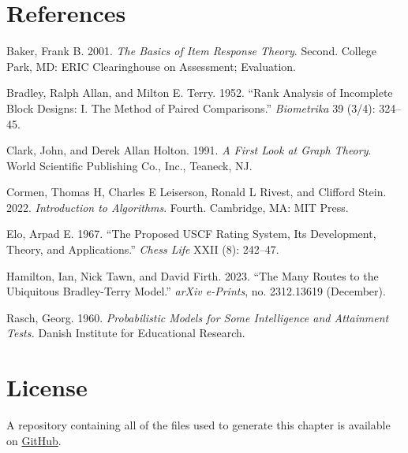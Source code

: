 \documentclass[
  letterpaper,
  DIV=11,
  numbers=noendperiod]{scrartcl}
\newlength{\cslhangindent}
\newenvironment{CSLReferences}[2] %
 {\begin{list}{}{%
  \setlength{\itemindent}{0pt}
  \setlength{\leftmargin}{0pt}
  \setlength{\parsep}{0pt}
  \ifodd #1
   \setlength{\leftmargin}{\cslhangindent}
   \setlength{\itemindent}{-1\cslhangindent}
  \fi
  \setlength{\itemsep}{#2\baselineskip}}}
 {\end{list}}
\begin{document}
\section*{References}\label{references}

\label{refs}
\begin{CSLReferences}{1}{0}
Baker, Frank B. 2001. \emph{The Basics of Item Response Theory}. Second.
College Park, MD: ERIC Clearinghouse on Assessment; Evaluation.

Bradley, Ralph Allan, and Milton E. Terry. 1952. {``Rank Analysis of
Incomplete Block Designs: I. The Method of Paired Comparisons.''}
\emph{Biometrika} 39 (3/4): 324--45.

Clark, John, and Derek Allan Holton. 1991. \emph{A First Look at Graph
Theory}. World Scientific Publishing Co., Inc., Teaneck, NJ.

Cormen, Thomas H, Charles E Leiserson, Ronald L Rivest, and Clifford
Stein. 2022. \emph{Introduction to Algorithms}. Fourth. Cambridge, MA:
MIT Press.

Elo, Arpad E. 1967. {``The Proposed USCF Rating System, Its Development,
Theory, and Applications.''} \emph{Chess Life} XXII (8): 242--47.

Hamilton, Ian, Nick Tawn, and David Firth. 2023. {``The Many Routes to
the Ubiquitous Bradley-Terry Model.''} \emph{arXiv e-Prints}, no.
2312.13619 (December).

Rasch, Georg. 1960. \emph{Probabilistic Models for Some Intelligence and
Attainment Tests.} Danish Institute for Educational Research.

\end{CSLReferences}

\section*{License}\label{license}

A repository containing all of the files used to generate this chapter
is available on
\href{https://github.com/betanalpha/quarto_modeling_techniques/tree/main/pairwise_comparison_modeling}{GitHub}.
\end{document}
